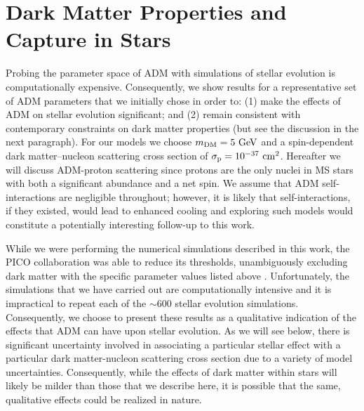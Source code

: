 \documentclass[useAMS,usenatbib]{mnras}
\begin{document}
\section{Dark Matter Properties and Capture in Stars}
\label{sec:props}

  Probing the parameter space of ADM with simulations of stellar evolution is computationally expensive. 
  Consequently, we show results for a representative set of 
  ADM parameters that we initially chose in order to: 
  (1) make the effects of ADM on stellar evolution significant; 
  and (2) remain consistent with contemporary constraints on 
  dark matter properties (but see the discussion in the next 
  paragraph). For our models we choose $m_{\mathrm{DM}} = 5 \ \mathrm{GeV}$ and a 
  spin-dependent dark matter--nucleon scattering cross section of 
  $\sigma_{\mathrm{p}} = 10^{-37} \ \mathrm{cm}^2$.
  Hereafter we will discuss ADM-proton scattering since protons 
  are the only nuclei in MS stars with both 
  a significant abundance and a net spin.
  We assume that ADM self-interactions 
  are negligible throughout; however, 
  it is likely that self-interactions, if they existed, 
  would lead to enhanced cooling 
  \citep[e.g.,][]{Zentner2009High-energySun} and exploring such models 
  would constitute a potentially interesting follow-up to this work.

  While we were performing the numerical simulations described in this 
  work, the PICO collaboration was able to reduce its thresholds, 
  unambiguously excluding dark matter with the specific parameter 
  values listed above \citep{PICO}. Unfortunately, the simulations 
  that we have carried out are computationally intensive and it is 
  impractical to repeat each of the $\sim 600$ stellar evolution 
  simulations. Consequently, we choose to present these results 
  as a qualitative indication of the effects that ADM can have 
  upon stellar evolution. As we will see below, there is 
  significant uncertainty involved in associating a particular 
  stellar effect with a particular dark matter-nucleon scattering 
  cross section due to a variety of model uncertainties. 
  Consequently, while the effects of dark matter within stars 
  will likely be milder than those that we describe here, it is 
  possible that the same, qualitative effects could be realized 
  in nature.
\end{document}
